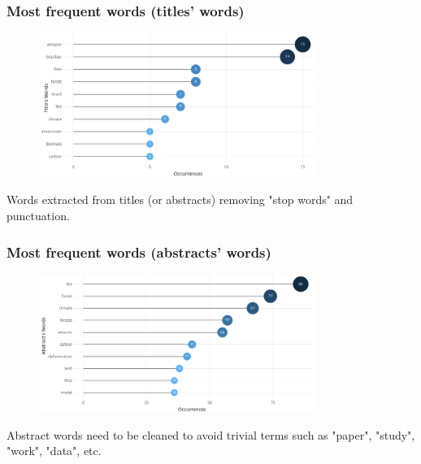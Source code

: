 \documentclass[aspectratio=169]{beamer}
\begin{document}
\begin{frame}
  \frametitle{Most frequent words (titles' words)}
  \begin{figure}
    \centering
    \includegraphics[width=0.8\textwidth]
    {img/most_frequent_words_titles_words.png}
    \label{fig:most_frequent_words_titles_words}
  \end{figure}
  Words extracted from titles (or abstracts) removing "stop words" and 
  punctuation.
\end{frame}

\begin{frame}
  \frametitle{Most frequent words (abstracts' words)}
  \begin{figure}
    \centering
    \includegraphics[width=0.8\textwidth]
    {img/most_frequent_words_abstracts_words.png}
    \label{fig:most_frequent_words_abstracts_words}
  \end{figure}
  Abstract words need to be cleaned to avoid trivial terms such as "paper", 
  "study", "work", "data", etc.
\end{frame}
\end{document}
